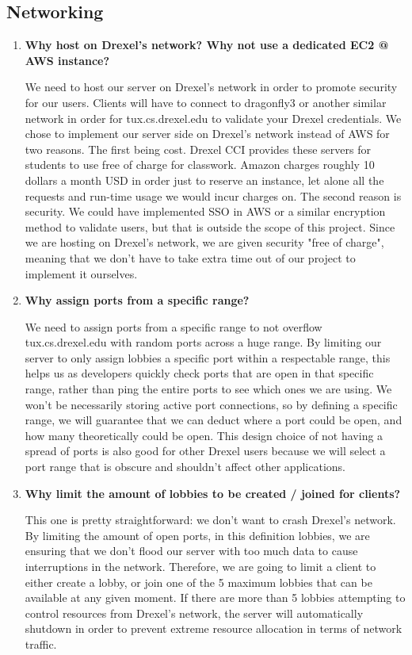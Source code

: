 \documentclass{scrreprt}
\begin{document}
		\subsection {Networking}
			\begin{enumerate} [label*=\arabic*.]

				\item\textbf{Why host on Drexel's network? Why not use a dedicated EC2 @ AWS instance?}
								
				We need to host our server on Drexel's network in order to promote security for our users. Clients will have to connect to dragonfly3 or another similar network in order for tux.cs.drexel.edu to validate your Drexel credentials. We chose to implement our server side on Drexel's network instead of AWS for two reasons. The first being cost. Drexel CCI provides these servers for students to use free of charge for classwork. Amazon charges roughly 10 dollars a month USD in order just to reserve an instance, let alone all the requests and run-time usage we would incur charges on. The second reason is security. We could have implemented SSO in AWS or a similar encryption method to validate users, but that is outside the scope of this project. Since we are hosting on Drexel's network, we are given security "free of charge", meaning that we don't have to take extra time out of our project to implement it ourselves.
 
				\item\textbf{Why assign ports from a specific range?}

				We need to assign ports from a specific range to not overflow tux.cs.drexel.edu with random ports across a huge range. By limiting our server to only assign lobbies a specific port within a respectable range, this helps us as developers quickly check ports that are open in that specific range, rather than ping the entire ports to see which ones we are using. We won't be necessarily storing active port connections, so by defining a specific range, we will guarantee that we can deduct where a port could be open, and how many theoretically could be open. This design choice of not having a spread of ports is also good for other Drexel users because we will select a port range that is obscure and shouldn't affect other applications.

				\item\textbf{Why limit the amount of lobbies to be created / joined for clients?}

				This one is pretty straightforward: we don't want to crash Drexel's network. By limiting the amount of open ports, in this definition lobbies, we are ensuring that we don't flood our server with too much data to cause interruptions in the network. Therefore, we are going to limit a client to either create a lobby, or join one of the 5 maximum lobbies that can be available at any given moment. If there are more than 5 lobbies attempting to control resources from Drexel's network, the server will automatically shutdown in order to prevent extreme resource allocation in terms of network traffic.


\end{enumerate}
\end{document}
